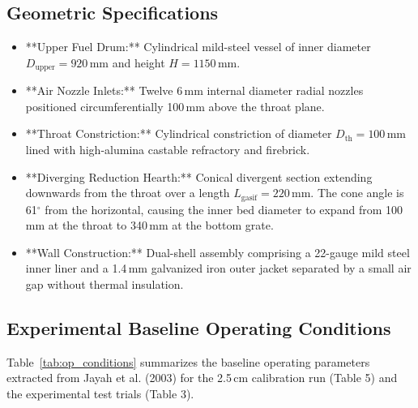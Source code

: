 \documentclass[11pt,a4paper]{article}
\begin{document}
\subsection{Geometric Specifications}
\begin{itemize}[leftmargin=1.5em]
    \item **Upper Fuel Drum:** Cylindrical mild-steel vessel of inner diameter $D_{\text{upper}} = 920$\,mm and height $H = 1150$\,mm.
    \item **Air Nozzle Inlets:** Twelve 6\,mm internal diameter radial nozzles positioned circumferentially 100\,mm above the throat plane.
    \item **Throat Constriction:** Cylindrical constriction of diameter $D_{\text{th}} = 100$\,mm lined with high-alumina castable refractory and firebrick.
    \item **Diverging Reduction Hearth:** Conical divergent section extending downwards from the throat over a length $L_{\text{gasif}} = 220$\,mm. The cone angle is 61$^\circ$ from the horizontal, causing the inner bed diameter to expand from 100\,mm at the throat to 340\,mm at the bottom grate.
    \item **Wall Construction:** Dual-shell assembly comprising a 22-gauge mild steel inner liner and a 1.4\,mm galvanized iron outer jacket separated by a small air gap without thermal insulation.
\end{itemize}

\subsection{Experimental Baseline Operating Conditions}
Table~\ref{tab:op_conditions} summarizes the baseline operating parameters extracted from Jayah et al. (2003) for the 2.5\,cm calibration run (Table 5) and the experimental test trials (Table 3).
\end{document}
